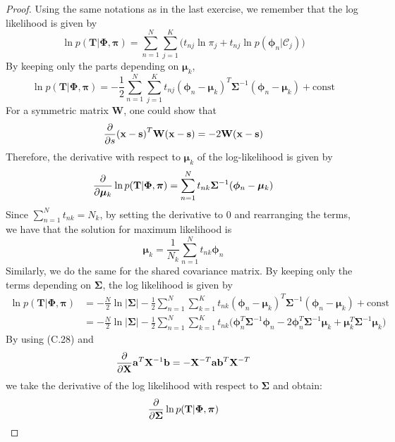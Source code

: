 \begin{proof}
    Using the same notations as in the last exercise, we remember that the
    log likelihood is given by
    \[
        \ln p(\mathbf{T} | \mathbf{\Phi}, \bm{\pi})
        = \sum_{n=1}^{N} \sum_{j=1}^{K} \bigg(t_{nj} \ln \pi_j
        + t_{nj} \ln p(\bm{\phi}_n | \mathcal{C}_j)\bigg)
    \] 
    By keeping only the parts depending on $\bm{\mu}_k$,
    \[
        \ln p(\mathbf{T} | \mathbf{\Phi}, \bm{\pi})
        = -\frac{1}{2}\sum_{n=1}^{N} \sum_{j=1}^{K} 
        t_{nj} (\bm{\phi}_n - \bm{\mu}_k)^T\mathbf{\Sigma}^{-1}
            (\bm{\phi}_n - \bm{\mu}_k) + \text{const}
    \] 
    For a symmetric matrix $\mathbf{W}$, one could show that
    \[
        \pdv{s}(\mathbf{x} - \mathbf{s})^T\mathbf{W}(\mathbf{x} - \mathbf{s}) 
        = -2 \mathbf{W}(\mathbf{x} - \mathbf{s})
    \] 
    Therefore, the derivative with respect to $\mathbf{\mu}_k$ of the 
    log-likelihood is given by
    \[
        \pdv{\bm{\mu}_k}
        \ln p(\mathbf{T} | \mathbf{\Phi}, \bm{\pi})
        = \sum_{n=1}^{N} t_{nk} \mathbf{\Sigma}^{-1}(\bm{\phi}_n - \bm{\mu}_k)
    \] 
    Since $\sum_{n=1}^{N} t_{nk} = N_k$, 
    by setting the derivative to 0 and rearranging the terms, we have that
    the solution for maximum likelihood is
    \[
        \bm{\mu}_k = \frac{1}{N_k} \sum_{n=1}^{N} t_{nk} \bm{\phi}_n
        \tag{4.161}
    \] 
    Similarly, we do the same for the shared covariance matrix.
    By keeping only the terms depending on $\mathbf{\Sigma}$, the
    log likelihood is given by
    \begin{align*}
        \ln p(\mathbf{T} | \mathbf{\Phi}, \bm{\pi})
        &= -\frac{N}{2} \ln|\mathbf{\Sigma}| - \frac{1}{2}\sum_{n=1}^{N} \sum_{k=1}^{K} 
            t_{nk} (\bm{\phi}_n - \bm{\mu}_k)^T\mathbf{\Sigma}^{-1}
            (\bm{\phi}_n - \bm{\mu}_k) + \text{const} \\
        &= -\frac{N}{2} \ln|\mathbf{\Sigma}| - \frac{1}{2}\sum_{n=1}^{N} \sum_{k=1}^{K} 
            t_{nk} \big(\bm{\phi}_n^T\mathbf{\Sigma}^{-1}\bm{\phi}_n 
            - 2\bm{\phi}_n^T\mathbf{\Sigma}^{-1}\bm{\mu}_k 
            + \bm{\mu}_k^T\mathbf{\Sigma}^{-1}\bm{\mu}_k\big)
    \end{align*}
    By using (C.28) and 
    \[
    \pdv{\mathbf{X}} \mathbf{a}^T\mathbf{X}^{-1}\mathbf{b}
    = -\mathbf{X}^{-T} \mathbf{ab}^T \mathbf{X}^{-T}
    \] 
    we take the derivative of the log likelihood with respect to $\mathbf{\Sigma}$ 
    and obtain:
    \begin{align*}
        \pdv{\mathbf{\Sigma}} \ln p(\mathbf{T} | \mathbf{\Phi}, \bm{\pi})

\end{align*}
\end{proof}
